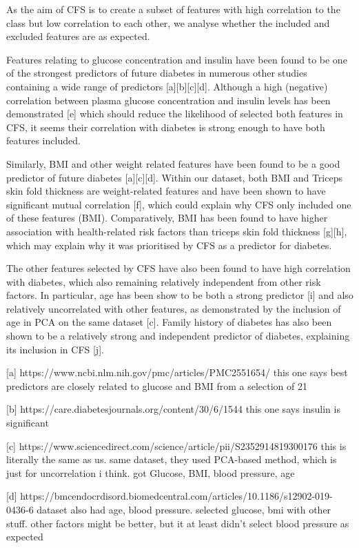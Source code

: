 As the aim of CFS is to create a subset of features with high correlation to the class but low correlation to each other, we analyse whether the included and excluded features are as expected.

Features relating to glucose concentration and insulin have been found to be one of the strongest predictors of future diabetes in numerous other studies containing a wide range of predictors [a][b][c][d]. Although a high (negative) correlation between plasma glucose concentration and insulin levels has been demonstrated [e] which should reduce the likelihood of selected both features in CFS, it seems their correlation with diabetes is strong enough to have both features included. 

Similarly, BMI and other weight related features have been found to be a good predictor of future diabetes [a][c][d]. Within our dataset, both BMI and Triceps skin fold thickness are weight-related features and have been shown to have significant mutual correlation [f], which could explain why CFS only included one of these features (BMI). Comparatively, BMI has been found to have higher association with health-related risk factors than triceps skin fold thickness [g][h], which may explain why it was prioritised by CFS as a predictor for diabetes.

The other features selected by CFS have also been found to have high correlation with diabetes, which also remaining relatively independent from other risk factors. In particular, age has been show to be both a strong predictor [i] and also relatively uncorrelated with other features, as demonstrated by the inclusion of age in PCA on the same dataset [c]. Family history of diabetes has also been shown to be a relatively strong and independent predictor of diabetes, explaining its inclusion in CFS [j].


[a] https://www.ncbi.nlm.nih.gov/pmc/articles/PMC2551654/
this one says best predictors are closely related to glucose and BMI from a selection of 21

[b] https://care.diabetesjournals.org/content/30/6/1544
this one says insulin is significant

[c] https://www.sciencedirect.com/science/article/pii/S2352914819300176
this is literally the same as us. same dataset, they used PCA-based method, which is just for uncorrelation i think. got Glucose, BMI, blood pressure, age

[d] https://bmcendocrdisord.biomedcentral.com/articles/10.1186/s12902-019-0436-6
dataset also had age, blood pressure. selected glucose, bmi with other stuff. other factors might be better, but it at least didn't select blood pressure as expected

